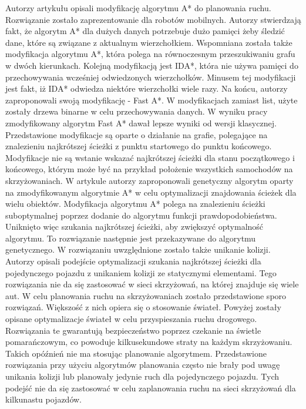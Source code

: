 \indent
Autorzy artykułu \cite{munteanmobile} opisali modyfikację algorytmu A* do planowania ruchu. Rozwiązanie zostało zaprezentowanie dla robotów mobilnych. Autorzy stwierdzają fakt, że algorytm A* dla dużych danych potrzebuje dużo pamięci żeby śledzić dane, które są związane z aktualnym wierzchołkiem. Wspomniana została także modyfikacja algorytmu A*, która polega na równoczesnym przeszukiwaniu grafu w dwóch kierunkach. Kolejną modyfikacją jest IDA*, która nie używa pamięci do przechowywania wcześniej odwiedzonych wierzchołków. Minusem tej modyfikacji jest fakt, iż IDA* odwiedza niektóre wierzchołki wiele razy. Na końcu, autorzy zaproponowali swoją modyfikację - Fast A*. W modyfikacjach zamiast list, użyte zostały drzewa binarne w celu przechowywania danych. W wyniku pracy zmodyfikowany algorytm Fast A* dawał lepsze wyniki od wersji klasycznej. Przedstawione modyfikacje są oparte o działanie na grafie, polegające na znalezieniu najkrótszej ścieżki z punktu startowego do punktu końcowego. Modyfikacje nie są wstanie wskazać najkrótszej ścieżki dla stanu początkowego i końcowego, którym może być na przykład położenie wszystkich samochodów na skrzyżowaniach.
\newline
\indent
W artykule \cite{oleiwi2014modified} autorzy zaproponowali genetyczny algorytm oparty na zmodyfikowanym algorytmie A* w celu optymalizacji znajdowania ścieżek dla wielu obiektów. Modyfikacja algorytmu A* polega na znalezieniu ścieżki suboptymalnej poprzez dodanie do algorytmu funkcji prawdopodobieństwa. Uniknięto więc szukania najkrótszej ścieżki, aby zwiększyć optymalność algorytmu. To rozwiązanie następnie jest przekazywane do algorytmu genetycznego. W rozwiązaniu uwzględnione zostało także unikanie kolizji. Autorzy opisali podejście optymalizacji szukania najkrótszej ścieżki dla pojedynczego pojazdu z unikaniem kolizji ze statycznymi elementami. Tego rozwiązania nie da się zastosować w sieci skrzyżowań, na której znajduje się wiele aut.
\newline
\indent
W celu planowania ruchu na skrzyżowaniach zostało przedstawione sporo rozwiązań. Większość z nich opiera się o stosowanie świateł. Powyżej zostały opisane optymalizacje świateł w celu przyspieszania ruchu drogowego. Rozwiązania te gwarantują bezpieczeństwo poprzez czekanie na świetle pomarańczowym, co powoduje kilkusekundowe straty na każdym skrzyżowaniu. Takich opóźnień nie ma stosując planowanie algorytmem. Przedstawione rozwiązania przy użyciu algorytmów planowania często nie brały pod uwagę unikania kolizji lub planowały jedynie ruch dla pojedynczego pojazdu. Tych podejść nie da się zastosować w celu zaplanowania ruchu na sieci skrzyżowań dla kilkunastu pojazdów.
